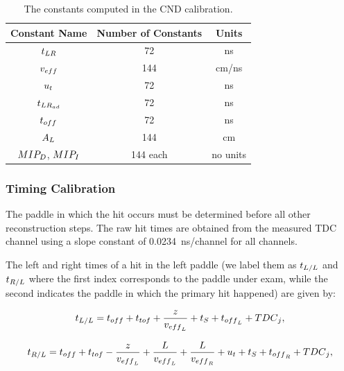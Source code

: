 \documentclass{elsart}
\begin{document}
\begin{table}[htbp]
\begin{center}
\begin{tabular}{|c|c|c|} \hline
Constant Name & Number of Constants  & Units \\ \hline
$t_{\rm{LR}}$ & 72 & ns\\ \hline
$v_{\rm{eff}}$ & 144 & cm/ns \\ \hline
$u_{\rm{t}}$ & 72 & ns \\ \hline
$t_{\rm{LR}_{\rm{ad}}}$ & 72 & ns \\ \hline
$t_{\rm{off}}$ &72 & ns\\ \hline
$A_{\rm{L}}$ & 144 & cm\\ \hline
$MIP_{\rm{D}}$, $MIP_{\rm{I}}$ & 144 each & no units \\ \hline
\end{tabular}
\caption{The constants computed in the CND calibration.}
\label{table_cnd_constants}
\end{center}
\end{table}

\subsubsection{Timing Calibration}

The paddle in which the hit occurs must be determined before all other reconstruction steps. The raw hit
times are obtained from the measured TDC channel using a slope constant of 0.0234~ns/channel for all
channels.

The left and right times of a hit in the left paddle (we label them as $t_{{\rm{L}}/{\rm{L}}}$ and
$t_{\rm{R}/{\rm{L}}}$ where the first index corresponds to the paddle under exam, while the second indicates
the paddle in which the primary hit happened) are given by:

\begin{equation}
\label{eq_time_hit_lr}
t_{{\rm{L}}/{\rm{L}}}=t_{\rm{off}}+t_{\rm{tof}}+\frac{z}{v_{\rm{eff}_L}}+t_{\rm{S}}+t_{\rm{off}_{\rm{L}}}+{\rm{TDC}}_{\rm{j}},
\end{equation}

\begin{equation}
\label{eq_time_hit_lr1}
t_{{\rm{R}/{\rm{L}}}}=t_{\rm{off}}+t_{\rm{tof}}-\frac{z}{v_{\rm{eff}_L}}+\frac{L}{v_{\rm{eff}_L}}
+\frac{L}{v_{\rm{eff}_{\rm{R}}}}+u_{\rm{t}}+t_{\rm{S}}+t_{\rm{off}_{\rm{R}}}+{\rm{TDC}}_{\rm{j}},
\end{equation}
\end{document}
